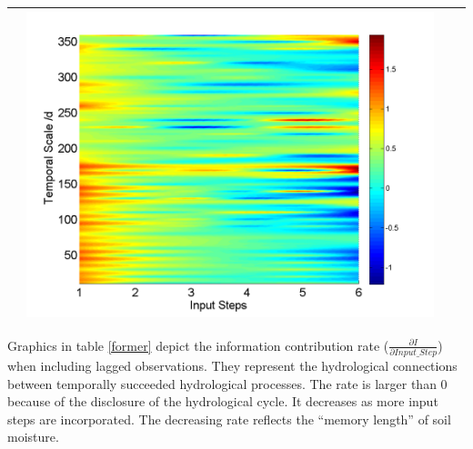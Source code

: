 \documentclass[draft,wrr]{AGUTeX}
\begin{document}
\begin{article}
\begin{table}[H]
\begin{tabular}{cccc}
&\begin{minipage}{.3\textwidth}\includegraphics[width=\linewidth]{resultgraph/06810000qdiff_former.png}\end{minipage}
\\
\hline
\end{tabular}
\end{table}
Graphics in table \ref{former} depict the information contribution rate ($\frac{\partial I}{\partial Input\_Step}$) when including lagged observations. They represent the hydrological connections between temporally succeeded hydrological processes. The rate is larger than 0 because of the disclosure of the hydrological cycle. It decreases as more input steps are incorporated. The decreasing rate reflects the ``memory length'' of soil moisture.  



\end{article}
\end{document}
